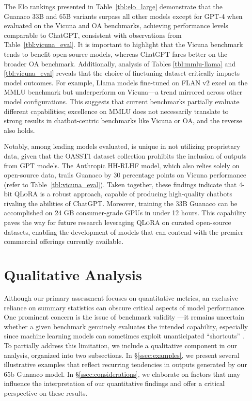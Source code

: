 The Elo rankings presented in Table~\ref{tbl:elo_large} demonstrate that the {Guanaco} 33B and 65B variants surpass all other models except for GPT-4 when evaluated on the Vicuna and OA benchmarks, achieving performance levels comparable to ChatGPT, consistent with observations from Table~\ref{tbl:vicuna_eval}. It is important to highlight that the Vicuna benchmark tends to benefit open-source models, whereas ChatGPT fares better on the broader OA benchmark. Additionally, analysis of Tables \ref{tbl:mmlu-llama} and \ref{tbl:vicuna_eval} reveals that the choice of finetuning dataset critically impacts model outcomes. For example, Llama models fine-tuned on FLAN v2 excel on the MMLU benchmark but underperform on Vicuna—a trend mirrored across other model configurations. This suggests that current benchmarks partially evaluate different capabilities; excellence on MMLU does not necessarily translate to strong results in chatbot-centric benchmarks like Vicuna or OA, and the reverse also holds.

Notably, among leading models evaluated, is unique in not utilizing proprietary data, given that the OASST1 dataset collection prohibits the inclusion of outputs from GPT models. The Anthropic HH-RLHF model, which also relies solely on open-source data, trails {Guanaco} by 30 percentage points on Vicuna performance (refer to Table~\ref{tbl:vicuna_eval}). Taken together, these findings indicate that 4-bit \textsc{QLoRA} is a robust approach, capable of producing high-quality chatbots rivaling the abilities of ChatGPT. Moreover, training the 33B {Guanaco} can be accomplished on 24 GB consumer-grade GPUs in under 12 hours. This capability paves the way for future research leveraging \textsc{QLoRA} on curated open-source datasets, enabling the development of models that can contend with the premier commercial offerings currently available.

\section{Qualitative Analysis}

Although our primary assessment focuses on quantitative metrics, an exclusive reliance on summary statistics can obscure critical aspects of model performance. One prominent concern is the issue of benchmark validity \citep{liao2021we}—it remains uncertain whether a given benchmark genuinely evaluates the intended capability, especially since machine learning models can sometimes exploit unanticipated ``shortcuts'' \citep{gururangan2018annotation, poliak2018hypothesis}. To partially address this limitation, we include a qualitative component in our analysis, organized into two subsections. In \S\ref{ssec:examples}, we present several illustrative examples that reflect recurring tendencies in outputs generated by our 65b {Guanaco} model. In \S\ref{ssec:considerations}, we elaborate on factors that may influence the interpretation of our quantitative findings and offer a critical perspective on these results.

